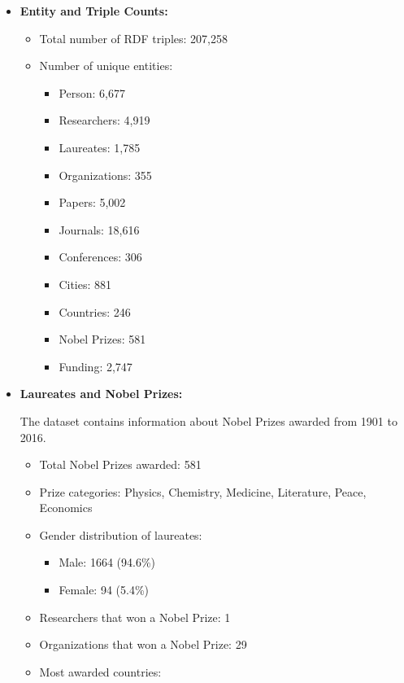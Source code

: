 \documentclass{article}
\begin{document}
\begin{itemize}
    \item \textbf{Entity and Triple Counts:}
    \begin{itemize}
        \item Total number of RDF triples: 207,258
        \item Number of unique entities:
        \begin{itemize}
            \item Person: 6,677
            \item Researchers: 4,919
            \item Laureates: 1,785
            \item Organizations: 355
            \item Papers: 5,002
            \item Journals: 18,616
            \item Conferences: 306
            \item Cities: 881
            \item Countries: 246
            \item Nobel Prizes: 581
            \item Funding: 2,747
        \end{itemize}
    \end{itemize}
    
    \item \textbf{Laureates and Nobel Prizes:}

    The dataset contains information about Nobel Prizes awarded from 1901 to 2016.
    \begin{itemize}
        \item Total Nobel Prizes awarded: 581
        \item Prize categories: Physics, Chemistry, Medicine, Literature, Peace, Economics
        \item Gender distribution of laureates:
        \begin{itemize}
            \item Male: 1664 (94.6\%)
            \item Female: 94 (5.4\%)
        \end{itemize}
        \item Researchers that won a Nobel Prize: 1
        \item Organizations that won a Nobel Prize: 29
        \item Most awarded countries: 


\end{itemize}
\end{itemize}
\end{document}
